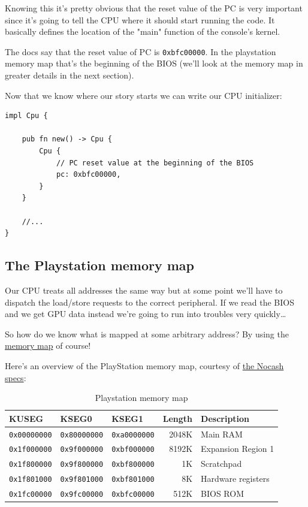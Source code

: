 \documentclass[a4paper]{article}
\newcommand{\code}[1] {\texttt{#1}}
\begin{document}
Knowing this it's pretty obvious that the reset value of the
PC is very important since it's going to tell the CPU where
it should start running the code. It basically defines the location of
the "main" function of the console's kernel.

The docs say that the reset value of PC is
\code{0xbfc00000}. In the playstation memory map that's the
beginning of the BIOS (we'll look at the memory map in greater details
in the next section).

Now that we know where our story starts we can write our CPU
initializer:

\begin{lstlisting}
impl Cpu {

    pub fn new() -> Cpu {
     	Cpu {
            // PC reset value at the beginning of the BIOS
            pc: 0xbfc00000,
        }
    }

    //...
}
\end{lstlisting}

\subsection{The Playstation memory map}

Our CPU treats all addresses the same way but at some point we'll have
to dispatch the load/store requests to the correct peripheral. If we
read the BIOS and we get GPU data instead we're going to run into
troubles very quickly\dots{}

So how do we know what is mapped at some arbitrary address? By using
the \href{https://en.wikipedia.org/wiki/Memory_map}{memory map} of
course!

Here's an overview of the PlayStation memory map, courtesy of
\href{http://problemkaputt.de/psx-spx.htm#cpuspecifications}{the Nocash
  specs}:

\begin{table}[ht]
  \centering

  \begin{tabular}{ l | l | l | r | l }
    KUSEG & KSEG0 & KSEG1 & Length & Description \\
    \hline
    \code{0x00000000} & \code{0x80000000} & \code{0xa0000000} & 2048K
     & Main RAM \\
    \code{0x1f000000} & \code{0x9f000000} & \code{0xbf000000} & 8192K
     & Expansion Region 1 \\
    \code{0x1f800000} & \code{0x9f800000} & \code{0xbf800000} &    1K
     & Scratchpad \\
    \code{0x1f801000} & \code{0x9f801000} & \code{0xbf801000} &    8K
     & Hardware registers \\
    \code{0x1fc00000} & \code{0x9fc00000} & \code{0xbfc00000} &  512K
     & BIOS ROM \\
  \end{tabular}

  \caption{Playstation memory map}
  \label{tab:mmap}
\end{table}
\end{document}
